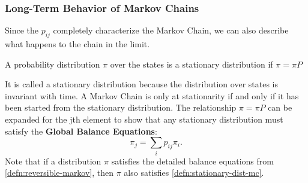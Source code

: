 \subsubsection{Long-Term Behavior of Markov Chains}
Since the $p_{ij}$ completely characterize the Markov Chain, we can also describe what happens to the chain in the limit.
\begin{definition}
	A probability distribution $\pi$ over the states is a stationary distribution if $\pi = \pi P$
	\label{defn:stationary-dist-mc}
\end{definition}
It is called a stationary distribution because the distribution over states is invariant with time.
A Markov Chain is only at stationarity if and only if it has been started from the stationary distribution.
The relationship $\pi = \pi P$ can be expanded for the jth element to show that any stationary distribution must satisfy the \textbf{Global Balance Equations}:
\[
	\pi_j = \sum_i p_{ij}\pi_i.
\]
Note that if a distribution $\pi$ satisfies the detailed balance equations from \cref{defn:reversible-markov}, then $\pi$ also satisfies \cref{defn:stationary-dist-mc}.

